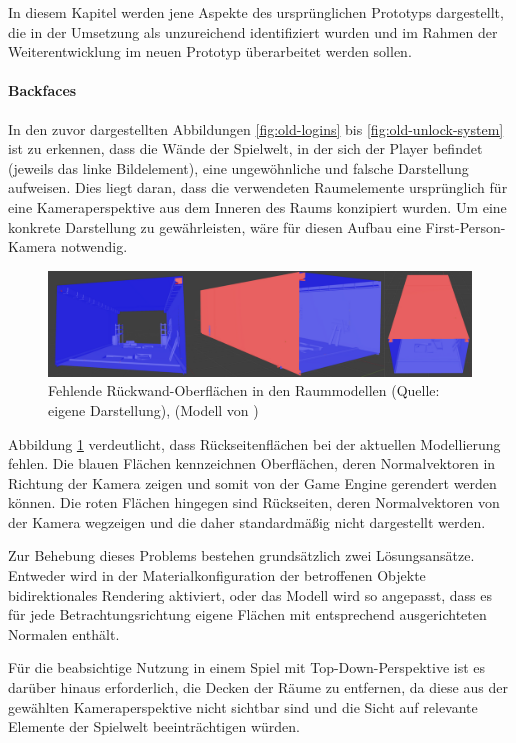 In diesem Kapitel werden jene Aspekte des ursprünglichen Prototyps dargestellt, die in der Umsetzung als unzureichend identifiziert wurden und im Rahmen der Weiterentwicklung im neuen Prototyp überarbeitet werden sollen.

\paragraph{Backfaces}

In den zuvor dargestellten Abbildungen \ref{fig:old-logins} bis \ref{fig:old-unlock-system} ist zu erkennen, dass die Wände der Spielwelt, in der sich der Player befindet (jeweils das linke Bildelement), eine ungewöhnliche und falsche Darstellung aufweisen. Dies liegt daran, dass die verwendeten Raumelemente ursprünglich für eine Kameraperspektive aus dem Inneren des Raums konzipiert wurden. Um eine konkrete Darstellung zu gewährleisten, wäre für diesen Aufbau eine First-Person-Kamera notwendig.

\begin{figure}[ht]
\centering
\includegraphics[width=1\linewidth]{content/pictures/Backfaces.png}
\caption{Fehlende Rückwand-Oberflächen in den Raummodellen (Quelle: eigene Darstellung), (Modell von \cite{alasl_autolevel_2022})}
\label{fig:missing-backfaces}
\end{figure}

Abbildung \ref{fig:missing-backfaces} verdeutlicht, dass Rückseitenflächen bei der aktuellen Modellierung fehlen. Die blauen Flächen kennzeichnen Oberflächen, deren Normalvektoren in Richtung der Kamera zeigen und somit von der Game Engine gerendert werden können. Die roten Flächen hingegen sind Rückseiten, deren Normalvektoren von der Kamera wegzeigen und die daher standardmäßig nicht dargestellt werden.

Zur Behebung dieses Problems bestehen grundsätzlich zwei Lösungsansätze. Entweder wird in der Materialkonfiguration der betroffenen Objekte bidirektionales Rendering aktiviert, oder das Modell wird so angepasst, dass es für jede Betrachtungsrichtung eigene Flächen mit entsprechend ausgerichteten Normalen enthält.

Für die beabsichtige Nutzung in einem Spiel mit Top-Down-Perspektive ist es darüber hinaus erforderlich, die Decken der Räume zu entfernen, da diese aus der gewählten Kameraperspektive nicht sichtbar sind und die Sicht auf relevante Elemente der Spielwelt beeinträchtigen würden.

